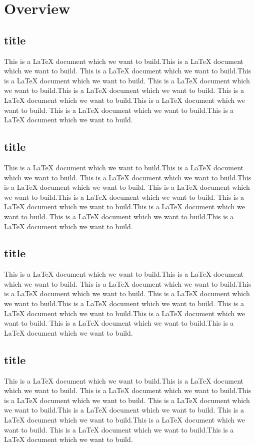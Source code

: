\documentclass{book}
\begin{document}
    \tableofcontents
    \chapter{Overview}
    \setcounter{page}{1}
    \section{title}
    This is a LaTeX document which we want to build.This is a LaTeX document which we want to build.
    This is a LaTeX document which we want to build.This is a LaTeX document which we want to build.
    This is a LaTeX document which we want to build.This is a LaTeX document which we want to build.
    This is a LaTeX document which we want to build.This is a LaTeX document which we want to build.
    This is a LaTeX document which we want to build.This is a LaTeX document which we want to build.
    \section{title}
    This is a LaTeX document which we want to build.This is a LaTeX document which we want to build.
    This is a LaTeX document which we want to build.This is a LaTeX document which we want to build.
    This is a LaTeX document which we want to build.This is a LaTeX document which we want to build.
    This is a LaTeX document which we want to build.This is a LaTeX document which we want to build.
    This is a LaTeX document which we want to build.This is a LaTeX document which we want to build.
    \section{title}
    This is a LaTeX document which we want to build.This is a LaTeX document which we want to build.
    This is a LaTeX document which we want to build.This is a LaTeX document which we want to build.
    This is a LaTeX document which we want to build.This is a LaTeX document which we want to build.
    This is a LaTeX document which we want to build.This is a LaTeX document which we want to build.
    This is a LaTeX document which we want to build.This is a LaTeX document which we want to build.
    \section{title}
    This is a LaTeX document which we want to build.This is a LaTeX document which we want to build.
    This is a LaTeX document which we want to build.This is a LaTeX document which we want to build.
    This is a LaTeX document which we want to build.This is a LaTeX document which we want to build.
    This is a LaTeX document which we want to build.This is a LaTeX document which we want to build.
    This is a LaTeX document which we want to build.This is a LaTeX document which we want to build.
\end{document}
